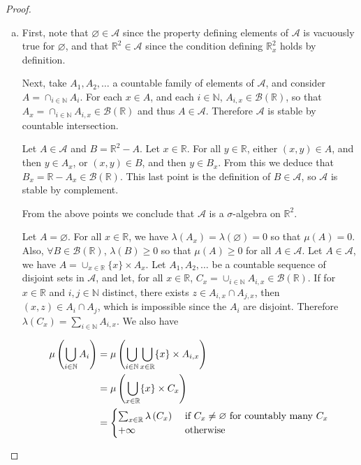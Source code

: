\documentclass[11pt,a4paper,twoside]{article}
\theoremstyle{definition}
\begin{document}
\begin{proof}

  \begin{enumerate}[(a)]

  \item First, note that $\varnothing \in \mathscr{A}$ since the property defining elements of $\mathscr{A}$ is vacuously true for $\varnothing$,
    and that $\mathbb{R}^2 \in \mathscr{A}$ since the condition defining $\mathbb{R}_x^2$ holds by definition.

    Next, take $A_1, A_2, \dotsc$ a countable family of elements of $\mathscr{A}$, and consider $A = \cap_{i \in \mathbb{N}} A_i$.
    For each $x \in A$, and each $i \in \mathbb{N}$, $A_{i, x} \in \mathscr{B} ( \mathbb{R} )$, so that $A_x = \cap_{i \in \mathbb{N}} A_{i, x} \in \mathscr{B} ( \mathbb{R} )$
    and thus $A \in \mathscr{A}$. Therefore $\mathscr{A}$ is stable by countable intersection.

    Let $A \in \mathscr{A}$ and $B = \mathbb{R}^2 - A$.
    Let $x \in \mathbb{R}$. For all $y \in \mathbb{R}$, either $(x, y) \in A$, and then $y \in A_x$, or $(x, y) \in B$, and then $y \in B_x$.
    From this we deduce that $B_x = \mathbb{R} - A_x \in \mathscr{B} ( \mathbb{R} )$.
    This last point is the definition of $B \in \mathscr{A}$, so $\mathscr{A}$ is stable by complement.

    From the above points we conclude that $\mathscr{A}$ is a $\sigma$-algebra on $\mathbb{R}^2$.

    Let $A = \varnothing$. For all $x \in \mathbb{R}$, we have $\lambda ( A_x ) = \lambda ( \varnothing ) = 0$ so that $\mu ( A ) = 0$.
    Also, $\forall B \in \mathscr{B} ( \mathbb{R} )$, $\lambda (B) \geq 0$ so that $\mu (A) \geq 0$ for all $A \in \mathscr{A}$.
    Let $A \in \mathscr{A}$, we have $A = \cup_{x \in \mathbb{R}} \{ x \} \times A_x$. Let $A_1, A_2, \dotsc$ be a countable sequence of disjoint sets in $\mathscr{A}$,
    and let, for all $x \in \mathbb{R}$, $C_x = \cup_{i \in \mathbb{N}} A_{i, x} \in \mathscr{B} ( \mathbb{R} )$.
    If for $x \in \mathbb{R}$ and $i, j \in \mathbb{N}$ distinct, there exists $z \in A_{i, x} \cap A_{j, x}$, then $(x, z) \in A_i \cap A_j$, which is impossible since
    the $A_i$ are disjoint. Therefore $\lambda ( C_x ) = \sum_{i \in \mathbb{N}} A_{i, x}$. We also have

    \begin{align} \label{eq:mu_union}
      \mu \left( \bigcup_{i \in \mathbb{N}} A_i \right) &= \mu \left( \bigcup_{i \in \mathbb{N}} \bigcup_{x \in \mathbb{R}} \{ x \} \times A_{i, x} \right) \notag \\
      &= \mu \left( \bigcup_{x \in \mathbb{R}} \{ x \} \times C_x \right)  \notag \\
      &= \begin{cases}
        \sum_{x \in \mathbb{R}} \lambda \left( C_x \right) &\text{ if } C_x \neq \varnothing \text{ for countably many } C_x \\
        +\infty &\text{ otherwise }
      \end{cases}
    \end{align}


\end{enumerate}
\end{proof}
\end{document}
